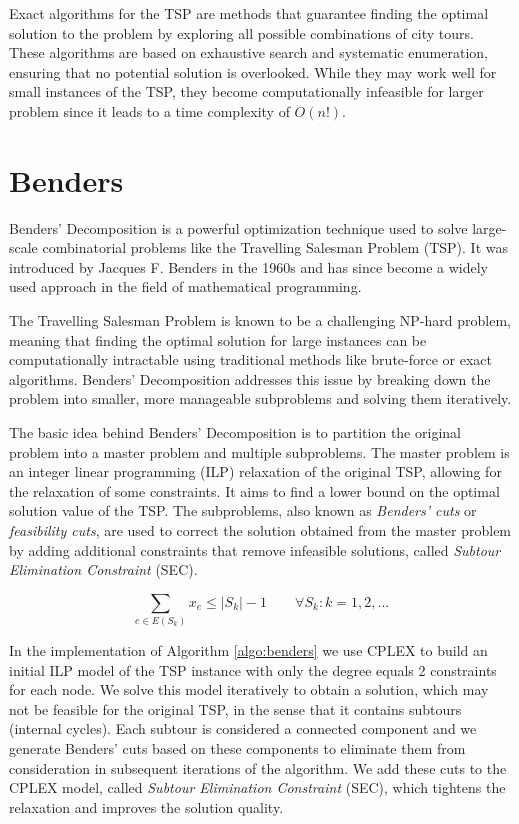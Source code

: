 Exact algorithms for the TSP are methods that guarantee finding the optimal solution to the problem by exploring all possible combinations of city tours. These algorithms are based on exhaustive search and systematic enumeration, ensuring that no potential solution is overlooked. While they may work well for small instances of the TSP, they become computationally infeasible for larger problem since it leads to a time complexity of $O(n!)$.


\section{Benders}
Benders' Decomposition is a powerful optimization technique used to solve large-scale combinatorial problems like the Travelling Salesman Problem (TSP). It was introduced by Jacques F. Benders in the 1960s and has since become a widely used approach in the field of mathematical programming.

The Travelling Salesman Problem is known to be a challenging NP-hard problem, meaning that finding the optimal solution for large instances can be computationally intractable using traditional methods like brute-force or exact algorithms. Benders' Decomposition addresses this issue by breaking down the problem into smaller, more manageable subproblems and solving them iteratively.

The basic idea behind Benders' Decomposition is to partition the original problem into a master problem and multiple subproblems. The master problem is an integer linear programming (ILP) relaxation of the original TSP, allowing for the relaxation of some constraints. It aims to find a lower bound on the optimal solution value of the TSP. The subproblems, also known as \textit{Benders' cuts} or \textit{feasibility cuts}, are used to correct the solution obtained from the master problem by adding additional constraints that remove infeasible solutions, called \textit{Subtour Elimination Constraint} (SEC).

\begin{equation*}
    \sum_{e \in E(S_k)} x_e \leq |S_k|-1 \quad \quad \forall S_k: k=1,2,...
\end{equation*}

In the implementation of Algorithm \ref{algo:benders} we use CPLEX to build an initial ILP model of the TSP instance with only the degree equals 2 constraints for each node. We solve this model iteratively to obtain a solution,  which may not be feasible for the original TSP, in the sense that it contains subtours (internal cycles). Each subtour is considered a connected component and we generate Benders' cuts based on these components to eliminate them from consideration in subsequent iterations of the algorithm. We add these cuts to the CPLEX model, called \textit{Subtour Elimination Constraint} (SEC), which tightens the relaxation and improves the solution quality.



